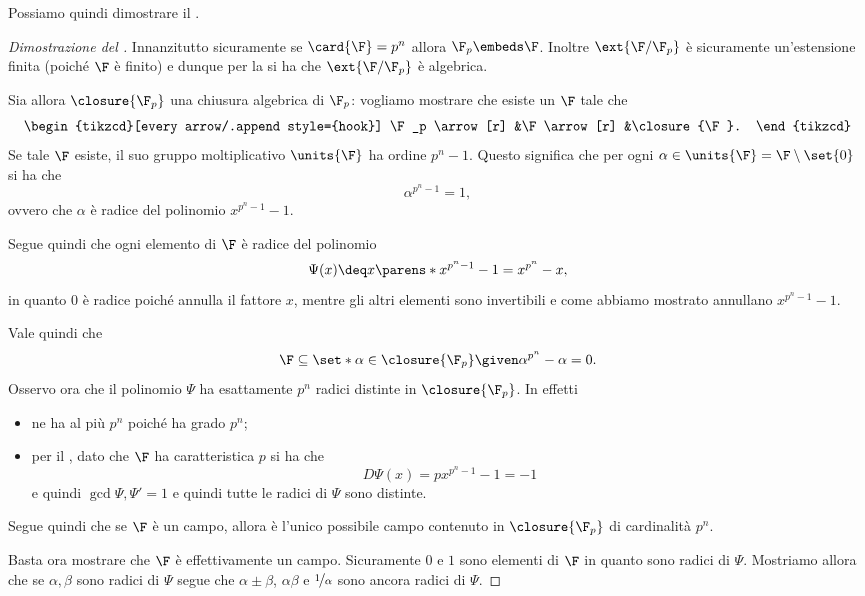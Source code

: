 Possiamo quindi dimostrare il .
\begin{proof}
    [Dimostrazione del ]
    Innanzitutto sicuramente se $\card{\F} = p^n$ allora $\F_p \embeds \F$. Inoltre $\ext{\F / \F_p}$ è sicuramente un'estensione finita (poiché $\F$ è finito) e dunque per la  si ha che $\ext{\F / \F_p}$ è algebrica. 
    
    Sia allora $\closure{\F_p}$ una chiusura algebrica di $\F_p$: vogliamo mostrare che esiste un $\F$ tale che \[
        \begin{tikzcd}[every arrow/.append style={hook}]
            \F_p \arrow[r]
            &\F \arrow[r]
            &\closure{\F}.
        \end{tikzcd}
    \] Se tale $\F$ esiste, il suo gruppo moltiplicativo $\units{\F}$ ha ordine $p^n - 1$. Questo significa che per ogni $\alpha \in \units{\F} = \F \setminus \set{0}$ si ha che \[
        \alpha^{p^n - 1} = 1,
    \] ovvero che $\alpha$ è radice del polinomio $x^{p^n - 1} - 1$.

    Segue quindi che ogni elemento di $\F$ è radice del polinomio \[
        \Psi(x) \deq x\parens*{x^{p^n - 1} - 1} = x^{p^n} - x,
    \] in quanto $0$ è radice poiché annulla il fattore $x$, mentre gli altri elementi sono invertibili e come abbiamo mostrato annullano $x^{p^n - 1} - 1$.
    
    Vale quindi che \[
        \F \subseteq \set*{\alpha \in \closure{\F_p} \given \alpha^{p^n} - \alpha = 0}.
    \] Osservo ora che il polinomio $\Psi$ ha esattamente $p^n$ radici distinte in $\closure{\F_p}$. In effetti
    \begin{itemize}
        \item ne ha al più $p^n$ poiché ha grado $p^n$;
        \item per il , dato che $\F$ ha caratteristica $p$ si ha che \[
            D\Psi(x) = px^{p^n - 1} - 1 = -1
        \] e quindi $\gcd{\Psi, \Psi'} = 1$ e quindi tutte le radici di $\Psi$ sono distinte.
    \end{itemize}
    
    Segue quindi che se $\F$ è un campo, allora è l'unico possibile campo contenuto in $\closure{\F_p}$ di cardinalità $p^n$.
    
    Basta ora mostrare che $\F$ è effettivamente un campo.
    Sicuramente $0$ e $1$ sono elementi di $\F$ in quanto sono radici di $\Psi$. Mostriamo allora che se $\alpha, \beta$ sono radici di $\Psi$ segue che $\alpha \pm \beta$, $\alpha\beta$ e $\nicefrac{1}{\alpha}$ sono ancora radici di $\Psi$.
    

\end{proof}
